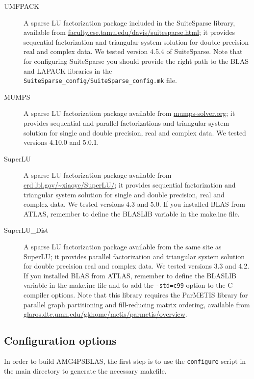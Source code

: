 \begin{description}
\item[UMFPACK] \cite{UMFPACK}
  A sparse LU factorization package included in the SuiteSparse library, available from
  \url{faculty.cse.tamu.edu/davis/suitesparse.html};
  it provides sequential factorization and triangular system solution for double
  precision real and complex data. We tested version 4.5.4 of SuiteSparse.
  Note that for configuring SuiteSparse you should provide the right path to the BLAS
  and LAPACK libraries in the \verb|SuiteSparse_config/SuiteSparse_config.mk| file.
\item[MUMPS] \cite{MUMPS}
  A sparse LU factorization package available from \url{mumps-solver.org};
  it provides sequential and parallel factorizations and triangular system solution
  for single and double precision, real and complex data.
  We tested versions 4.10.0 and 5.0.1.
\item[SuperLU] \cite{SUPERLU}
  A sparse LU factorization package available from
  \url{crd.lbl.gov/~xiaoye/SuperLU/}; it provides sequential
  factorization and triangular system solution for single and double precision,
  real and complex data. We tested versions 4.3 and 5.0. If you installed BLAS from
  ATLAS, remember to define the BLASLIB variable in the make.inc file.
 \item[SuperLU\_Dist] \cite{SUPERLUDIST}
   A sparse LU factorization package available
   from the same site as SuperLU; it provides parallel factorization and
   triangular system solution for double precision real and complex data.
   We tested versions 3.3 and 4.2. If you installed BLAS from
   ATLAS, remember to define the BLASLIB variable in the make.inc file and
   to add the \verb|-std=c99| option to the C compiler options.
   Note that this library requires the ParMETIS
   library for parallel graph partitioning and fill-reducing matrix ordering, available from
   \url{glaros.dtc.umn.edu/gkhome/metis/parmetis/overview}.
\end{description}

\subsection{Configuration options}

In order to build AMG4PSBLAS, the first step is to use the \verb|configure| script
in the main directory to generate the necessary makefile.

